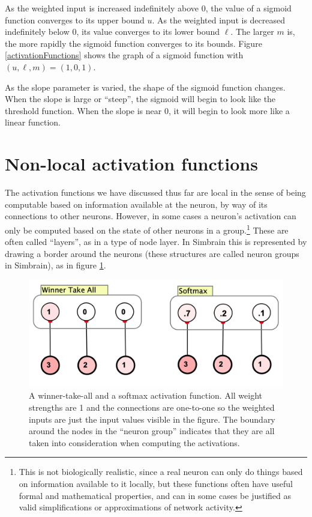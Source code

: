    As the weighted input is increased indefinitely above $0$, the value of a 
sigmoid function converges to its upper bound $u$. As the weighted input is 
decreased indefinitely below $0$, its value converges to its lower bound $\ell$.
The larger $m$ is, the more rapidly the sigmoid function converges to its 
bounds. Figure \ref{activationFunctions} shows the graph of a sigmoid function with 
$(u,\ell,m) = (1,0,1)$. 

As the slope parameter is varied, the shape of the sigmoid function changes. When the slope is
large or ``steep'', the sigmoid will begin to look like the threshold function. When the slope is near $0$, it will begin to look more like a linear function.

\section{Non-local activation functions}\label{wta_softmax_section}

The activation functions we have discussed thus far are local in the sense of being computable based on information available at the neuron, by way of its connections to other neurons. However, in some cases a neuron's activation can only be computed based on the state of other neurons in a group.\footnote{This is not biologically realistic, since a real neuron can only do things based on information available to it locally, but these functions often have useful formal and mathematical properties, and can in some cases be justified as valid simplifications or approximations of network activity.} These are often called ``layers'', as in a type of node layer. In Simbrain this is represented by drawing a border around the neurons (these structures are called neuron groups in Simbrain), as in figure \ref{wta_softmax}.

\begin{figure}[h]
\centering
\includegraphics[scale=.4]{./images/softmax_wta.png}
\caption[Jeff Yoshimi.]{A winner-take-all and a softmax activation function. All weight strengths are 1 and the connections are one-to-one so the weighted inputs are just the input values visible in the figure. The boundary around the nodes in the ``neuron group'' indicates that they are all taken into consideration when computing the activations.}
\label{wta_softmax}
\end{figure}

